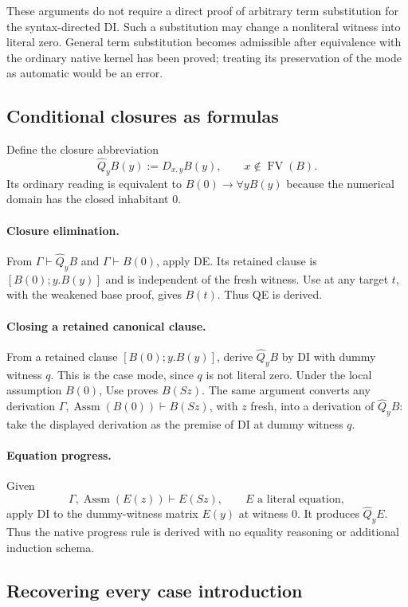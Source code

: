 These arguments do not require a direct proof of arbitrary term
substitution for the syntax-directed DI. Such a substitution may change
a nonliteral witness into literal zero. General term substitution becomes
admissible after equivalence with the ordinary native kernel has been
proved; treating its preservation of the mode as automatic would be an
error.

\subsection{Conditional closures as formulas}

Define the closure abbreviation
\[
 \widehat Q_y B(y):=D_{x,y}B(y),\qquad x\notin\operatorname{FV}(B).
\]
Its ordinary reading is equivalent to $B(0)\to\forall yB(y)$ because
the numerical domain has the closed inhabitant $0$.

\paragraph{Closure elimination.}
From $\Gamma\vdash\widehat Q_yB$ and $\Gamma\vdash B(0)$, apply DE.
Its retained clause is $[B(0);y.B(y)]$ and is independent of the fresh
witness. Use at any target $t$, with the weakened base proof, gives
$B(t)$. Thus QE is derived.

\paragraph{Closing a retained canonical clause.}
From a retained clause $[B(0);y.B(y)]$, derive $\widehat Q_yB$ by DI
with dummy witness $q$. This is the case mode, since $q$ is not literal
zero. Under the local assumption $B(0)$, Use proves $B(Sz)$.
The same argument converts any derivation
$\Gamma,\operatorname{Assm}(B(0))\vdash B(Sz)$, with $z$ fresh,
into a derivation of $\widehat Q_yB$: take the displayed derivation
as the premise of DI at dummy witness $q$.

\paragraph{Equation progress.}
Given
\[
 \Gamma,\operatorname{Assm}(E(z))\vdash E(Sz),
 \qquad E\text{ a literal equation},
\]
apply DI to the dummy-witness matrix $E(y)$ at witness $0$.
It produces $\widehat Q_yE$. Thus the native progress rule is derived
with no equality reasoning or additional induction schema.

\subsection{Recovering every case introduction}


